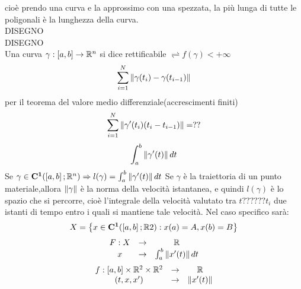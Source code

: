 cioè prendo una curva e la approssimo con una spezzata, la più lunga di tutte le poligonali è la lunghezza della curva.\\
DISEGNO\\
DISEGNO\\
Una curva $\gamma:\left[a,b\right]\to\mathbb{R}^n$ si dice rettificabile $\rightleftharpoons f(\gamma)<+\infty$
\observation
$$\sum\limits_{i=1}^{N}\left\|\gamma(t_i)-\gamma(t_{i-1})\right\| $$
per il teorema del valore medio differenziale(accrescimenti finiti)
$$\sum\limits_{i=1}^{N}\left\| \gamma'(t_i)(t_i-t_{i-1})\right\| =??$$
$$\int_{a}^{b}\left\| \gamma'(t)\right\| dt$$
\proposition
Se $\gamma\in \mathbf{C^{1}}(\left[a,b\right];\mathbb{R}^n)\Rightarrow l(\gamma)=\int_a^b\left\|\gamma'(t)\right\|dt$
\observation
Se $\gamma$ è la traiettoria di un punto materiale,allora $\left\|\gamma\right\|$ è la norma della velocità istantanea, e quindi $l(\gamma)$ è lo spazio che si percorre, cioè l'integrale della velocità valutato tra $t??????t_i$ due istanti di tempo entro i quali si mantiene tale velocità.
\observation
Nel caso specifico sarà:
$$ X=\left\{ x\in \mathbf{C^{1}}(\left[a,b\right];\mathbb{R}2): x(a)=A, x(b)=B \right\} $$
$$\begin{array}{ccc} 
F: X & \to & \mathbb{R} \\
x & \to & \int_{a}^b \left\|x'(t)\right\|dt
\end{array}$$
$$\begin{array}{ccc} 
f: \left[a,b\right]\times\mathbb{R}^2\times\mathbb{R}^2 & \to & \mathbb{R} \\
(t,x, x') & \to &  \left\|x'(t)\right\|
\end{array}$$
